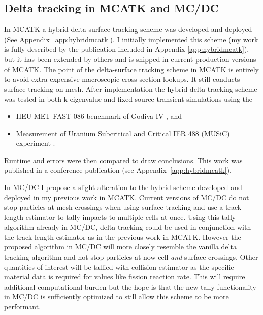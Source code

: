 \subsection{Delta tracking in MCATK and MC/DC}

In MCATK a hybrid delta-surface tracking scheme was developed and deployed (See Appendix~\ref{app:hybridmcatk}).
I initially implemented this scheme (my work is fully described by the publication included in Appendix \ref{app:hybridmcatk}), but it has been extended by others and is shipped in current production versions of MCATK.
The point of the delta-surface tracking scheme in MCATK is entirely to avoid extra expensive macroscopic cross section lookups.
It still conducts surface tracking on mesh.
After implementation the hybrid delta-tracking scheme was tested in both k-eigenvalue and fixed source transient simulations using the
\begin{itemize}
    \item HEU-MET-FAST-086 benchmark of Godiva IV \cite{godivaiv2021}, and
    \item Measurement of Uranium Subcritical and Critical IER 488 (MUSiC) experiment \cite{music2021}.
\end{itemize}
Runtime and errors were then compared to draw conclusions.
This work was published in a conference publication \cite{morgan2023oci} (see Appendix~\ref{app:hybridmcatk}).

In MC/DC I propose a slight alteration to the hybrid-scheme developed and deployed in my previous work in MCATK.
Current versions of MC/DC do not stop particles at mesh crossings when using surface tracking and use a track-length estimator to tally impacts to multiple cells at once.
Using this tally algorithm already in MC/DC, delta tracking could be used in conjunction with the track length estimator as in the previous work in MCATK.
However the proposed algorithm in MC/DC will more closely resemble the vanilla delta tracking algorithm and not stop particles at now cell \textit{and} surface crossings.
Other quantities of interest will be tallied with collision estimator as the specific material data is required for values like fission reaction rate.
This will require additional computational burden but the hope is that the new tally functionality in MC/DC is sufficiently optimized to still allow this scheme to be more performant.


